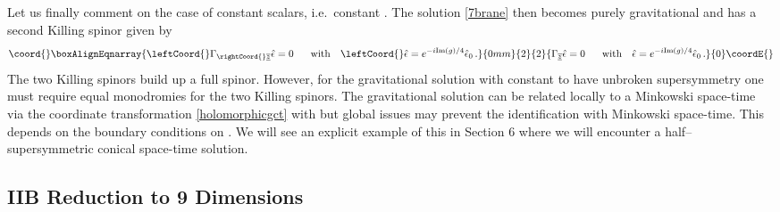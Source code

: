 \documentclass[12pt,a4paper]{article}
\begin{document}
Let us finally comment on the case of constant scalars, i.e.~constant \coordHE{}.
The solution \eqref{7brane} then becomes purely gravitational
and has a second Killing spinor given by
\begin{align}\coord{}\boxAlignEqnarray{
  \leftCoord{}\Gamma_{\rightCoord{}\overline{\underline{z}}} \hat{\epsilon} = 0 \text{~~~~ with ~~}
    \leftCoord{}\hat{\epsilon} = e^{-i\text{Im}(g)/4} \hat{\epsilon}_0 \,.
}{0mm}{2}{2}{
  \Gamma_{\overline{\underline{z}}} \hat{\epsilon} = 0 \text{~~~~ with ~~}
    \hat{\epsilon} = e^{-i\text{Im}(g)/4} \hat{\epsilon}_0 \,.
}{0}\coordE{}\end{align}
The two Killing spinors build up a full \coordHE{} spinor. However, for
the gravitational solution with constant \coordHE{} to have unbroken supersymmetry
one must require equal monodromies for the two Killing spinors.
The gravitational solution can be related locally to a Minkowski space-time via the
coordinate transformation \eqref{holomorphicgct} with \coordHE{}
but global issues may prevent the identification with Minkowski space-time.
This depends on the boundary conditions on \coordHE{}. We will see an explicit
example of this in Section 6 where we will encounter a half--supersymmetric 
conical space-time solution.


\subsection{IIB Reduction to 9 Dimensions}
\end{document}

